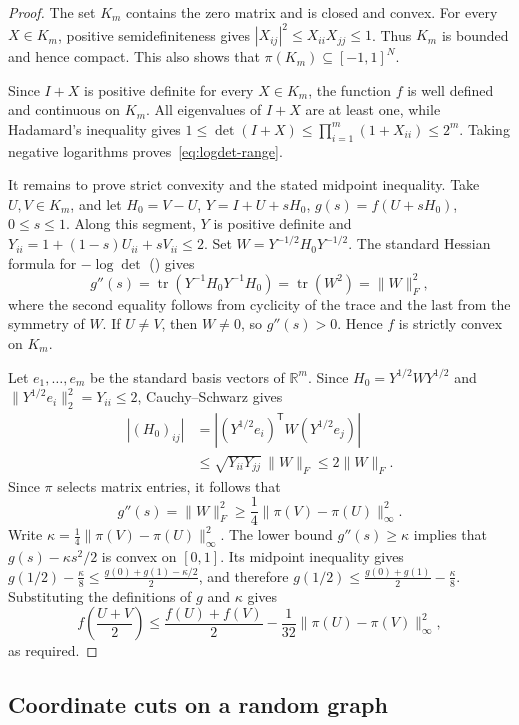 \documentclass[11pt]{article}
\numberwithin{equation}{section}
\theoremstyle{definition}
\theoremstyle{remark}
\DeclareMathOperator{\tr}{tr}
\newcommand{\R}{\mathbb R}
\begin{document}
\begin{proof}
The set $K_m$ contains the zero matrix and is closed and convex.
For every $X\in K_m$, positive semidefiniteness gives
$|X_{ij}|^2\leq X_{ii}X_{jj}\leq1$.
Thus $K_m$ is bounded and hence compact. This also shows that
$\pi(K_m)\subseteq[-1,1]^N$.

Since $I+X$ is positive definite for every $X\in K_m$, the function
$f$ is well defined and continuous on $K_m$. All eigenvalues of
$I+X$ are at least one, while Hadamard's inequality gives
$1\leq\det(I+X) \leq\prod_{i=1}^m(1+X_{ii}) \leq2^m$.
Taking negative logarithms proves~\eqref{eq:logdet-range}.

It remains to prove strict convexity and the stated midpoint
inequality. Take $U,V\in K_m$, and let
$H_0=V-U$, $Y=I+U+sH_0$, $g(s)=f(U+sH_0)$, $0\leq s\leq1$.
Along this segment, $Y$ is positive definite and
$Y_{ii}=1+(1-s)U_{ii}+sV_{ii}\leq2$.
Set
$W=Y^{-1/2}H_0Y^{-1/2}$.
The standard Hessian formula for $-\log\det$
(\cite[Appendix~A.4.3, p.~644]{BV}) gives
\[
 g''(s)
 =\tr(Y^{-1}H_0Y^{-1}H_0)
 =\tr(W^2)
 =\|W\|_F^2,
\]
where the second equality follows from cyclicity of the trace
and the last from the symmetry of $W$.
If $U\ne V$, then $W\ne0$, so $g''(s)>0$.
Hence $f$ is strictly convex on $K_m$.

Let $e_1,\ldots,e_m$ be the standard basis vectors of $\R^m$.
Since $H_0=Y^{1/2}WY^{1/2}$ and
$\|Y^{1/2}e_i\|_2^2=Y_{ii}\leq2$, Cauchy--Schwarz gives
\[
 \begin{aligned}
 |(H_0)_{ij}|
 &=\left|(Y^{1/2}e_i)^{\mathsf T}W(Y^{1/2}e_j)\right|\\
 &\leq\sqrt{Y_{ii}Y_{jj}}\,\|W\|_F
 \leq2\|W\|_F.
 \end{aligned}
\]
Since $\pi$ selects matrix entries, it follows that
\[
 g''(s)=\|W\|_F^2
 \geq\frac14\|\pi(V)-\pi(U)\|_\infty^2.
\]
Write
$\kappa=\frac14\|\pi(V)-\pi(U)\|_\infty^2$.
The lower bound $g''(s)\geq\kappa$ implies that
$g(s)-\kappa s^2/2$ is convex on $[0,1]$. Its midpoint inequality gives
$g(1/2)-\frac{\kappa}{8} \leq \frac{g(0)+g(1)-\kappa/2}{2}$,
and therefore
$g(1/2) \leq\frac{g(0)+g(1)}2-\frac{\kappa}{8}$.
Substituting the definitions of $g$ and $\kappa$ gives
\[
 f\left(\frac{U+V}{2}\right)
 \leq
 \frac{f(U)+f(V)}2
 -\frac1{32}\|\pi(U)-\pi(V)\|_\infty^2,
\]
as required.
\end{proof}

\subsection{Coordinate cuts on a random graph}
\end{document}
